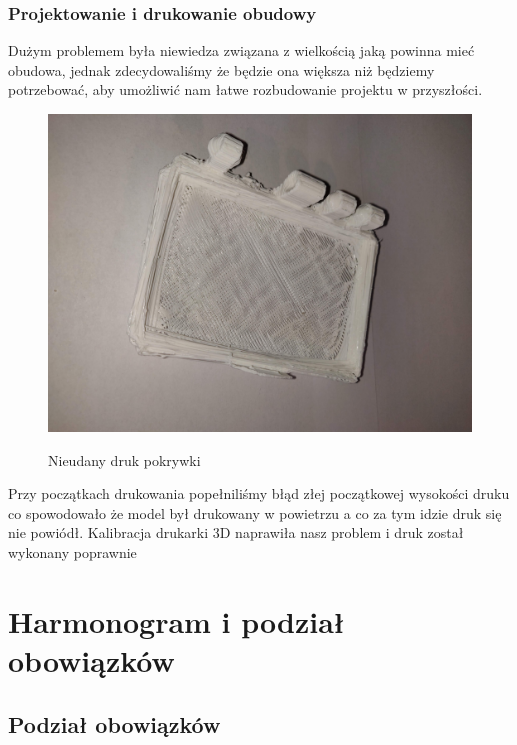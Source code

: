 \documentclass[12pt]{article}
\begin{document}
\subsubsection{Projektowanie i drukowanie obudowy}
Dużym problemem była niewiedza związana z wielkością jaką powinna mieć obudowa, jednak zdecydowaliśmy że będzie ona większa niż będziemy potrzebować, aby umożliwić nam łatwe rozbudowanie projektu w przyszłości. 


\begin{figure}[!h]
	\begin{center}
		{\includegraphics[width=12cm]{obudowa_broken.jpg}}
	\end{center}
	\caption{Nieudany druk pokrywki}
\end{figure}

Przy początkach drukowania popełniliśmy błąd złej początkowej wysokości druku co spowodowało że model był drukowany w powietrzu a co za tym idzie druk się nie powiódł. Kalibracja drukarki 3D naprawiła nasz problem i druk został wykonany poprawnie



\section{Harmonogram i podział obowiązków}

\subsection{Podział obowiązków}
\end{document}
